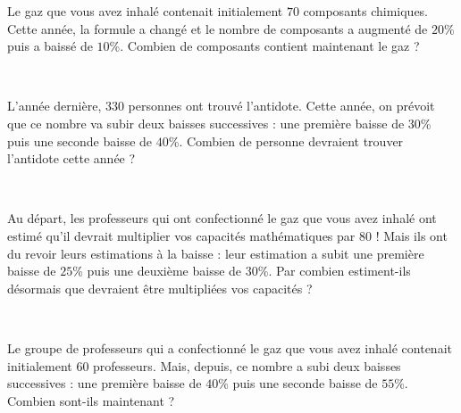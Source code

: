 \documentclass[10pt]{article}
\begin{document}
\begin{minipage}[]{.4\textwidth}
Le gaz que vous avez inhalé contenait initialement $70$ composants chimiques.
Cette année, la formule a changé et le nombre de composants a augmenté de $20$\%
puis a baissé de $10$\%. Combien de composants contient maintenant le gaz ?
\end{minipage}\\[25mm]


\begin{minipage}[]{.4\textwidth}
L'année dernière, $330$ personnes ont trouvé l'antidote. Cette année, on prévoit
que ce nombre va subir deux baisses successives : une première baisse de $30$\%
puis une seconde baisse de $40$\%. Combien de personne devraient trouver
l'antidote cette année ?
\end{minipage}\\[25mm]


\begin{minipage}[]{.4\textwidth}
Au départ, les professeurs qui ont confectionné le gaz que vous avez inhalé ont
estimé qu'il devrait multiplier vos capacités mathématiques par $80$ ! Mais ils
ont du revoir leurs estimations à la baisse : leur estimation a subit une
première baisse de $25$\% puis une deuxième baisse de $30$\%. Par combien
estiment-ils désormais que devraient être multipliées vos capacités ?
\end{minipage}\\[25mm]


\begin{minipage}[]{.4\textwidth}
Le groupe de professeurs qui a confectionné le gaz que vous avez inhalé
contenait initialement $60$ professeurs. Mais, depuis, ce nombre a subi deux
baisses successives : une première baisse de $40$\% puis une seconde baisse de
$55$\%. Combien sont-ils maintenant ?
\end{minipage}

\end{document}
